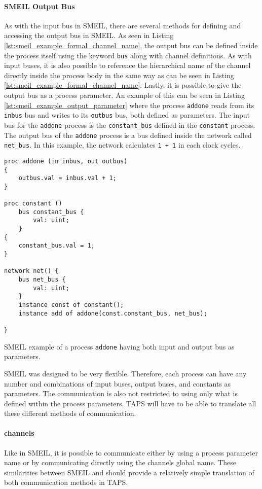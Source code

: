 \paragraph{SMEIL Output Bus}
As with the input bus in SMEIL, there are several methods for defining and accessing the output bus in SMEIL.
As seen in Listing \ref{lst:smeil_example_formal_channel_name}, the output bus can be defined inside the process itself using the keyword \texttt{bus} along with channel definitions. As with input buses, it is also possible to reference the hierarchical name of the channel directly inside the process body in the same way as can be seen in Listing \ref{lst:smeil_example_formal_channel_name}. Lastly, it is possible to give the output bus as a process parameter.
An example of this can be seen in Listing \ref{lst:smeil_example_output_parameter} where the process \texttt{addone} reads from its \texttt{inbus} bus and writes to its \texttt{outbus} bus, both defined as parameters. The input bus for the \texttt{addone} process is the \texttt{constant\_bus} defined in the \texttt{constant} process. The output bus of the \texttt{addone} process is a bus defined inside the network called \texttt{net\_bus}. In this example, the network calculates \texttt{1 + 1} in each clock cycles.
\begin{listing}
\begin{verbatim}
proc addone (in inbus, out outbus)
{
    outbus.val = inbus.val + 1;
}

proc constant ()
    bus constant_bus {
        val: uint;
    }
{
    constant_bus.val = 1;
}

network net() {
    bus net_bus {
        val: uint;
    }
    instance const of constant();
    instance add of addone(const.constant_bus, net_bus);

}
\end{verbatim}
\caption{SMEIL example of a process \texttt{addone} having both input and output bus as parameters.}
\label{lst:smeil_example_output_parameter}
\end{listing}

SMEIL was designed to be very flexible. Therefore, each process can have any number and combinations of input buses, output buses, and constants as parameters. The communication is also not restricted to using only what is defined within the process parameters. TAPS will have to be able to translate all these different methods of communication.

\paragraph{\cspm{} channels}
Like in SMEIL, it is possible to communicate either by using a process parameter name or by communicating directly using the channels global name. These similarities between SMEIL and \cspm{} should provide a relatively simple translation of both communication methods in TAPS.\\

